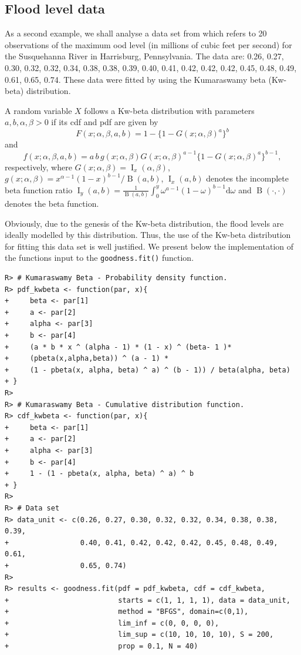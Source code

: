 \documentclass[10pt,letterpaper]{article}
\begin{document}
{\color{red}
\subsection{Flood level data}

As a second example, we shall analyse a data set from \cite{Dumonceaux73} which refers to 20 observations of
the maximum ood level (in millions of cubic feet per second) for the Susquehanna River in Harrisburg, Pennsylvania.
The data are: 0.26, 0.27, 0.30, 0.32, 0.32, 0.34, 0.38, 0.38, 0.39, 0.40, 0.41, 0.42, 0.42, 0.42, 0.45,
0.48, 0.49, 0.61, 0.65, 0.74.
These data were fitted by using the Kumaraswamy beta (Kw-beta) distribution.

A random variable $X$ follows a Kw-beta distribution with parameters $a, b, \alpha, \beta > 0$ if its cdf and pdf are given by
$$
F(x; \alpha, \beta, a, b) = 1-\{1-G(x; \alpha, \beta)^{a}\}^{b}$$
and
$$
f(x; \alpha, \beta, a, b) = a\,b\,g(x;\alpha, \beta)G(x;\alpha, \beta)^{a-1}\{1-G(x;\alpha, \beta)^{a}\}^{b-1},
$$
respectively, where $G(x; \alpha,\beta)=\operatorname{I}_{x}(\alpha,\beta)$, $g(x;\alpha,\beta) = x^{\alpha-1}(1-x)^{b-1}/\operatorname{B}(a,b)$,
$\operatorname{I}_{x}(a,b)$ denotes the incomplete beta function ratio
$\operatorname{I}_{y}(a,b) = \frac{1}{\operatorname{B}(a,b)}
\int^{y}_{0} \omega^{a-1}(1-\omega)^{b-1}\mathrm{d}\omega$
and $\operatorname{B}(\cdot,\cdot)$ denotes the beta function.

Obviously, due to the genesis of the Kw-beta distribution, the flood levels are ideally modelled by
this distribution.
Thus, the use of the Kw-beta distribution for fitting this data set is well justified.
We present below the implementation of the functions input to the \texttt{goodness.fit()} function.

\begin{verbatim}
R> # Kumaraswamy Beta - Probability density function.
R> pdf_kwbeta <- function(par, x){
+     beta <- par[1]
+     a <- par[2]
+     alpha <- par[3]
+     b <- par[4]
+     (a * b * x ^ (alpha - 1) * (1 - x) ^ (beta- 1 )*
+     (pbeta(x,alpha,beta)) ^ (a - 1) *
+     (1 - pbeta(x, alpha, beta) ^ a) ^ (b - 1)) / beta(alpha, beta)
+ }
R>
R> # Kumaraswamy Beta - Cumulative distribution function.
R> cdf_kwbeta <- function(par, x){
+     beta <- par[1]
+     a <- par[2]
+     alpha <- par[3]
+     b <- par[4]
+     1 - (1 - pbeta(x, alpha, beta) ^ a) ^ b
+ }
R>
R> # Data set
R> data_unit <- c(0.26, 0.27, 0.30, 0.32, 0.32, 0.34, 0.38, 0.38, 0.39,
+                 0.40, 0.41, 0.42, 0.42, 0.42, 0.45, 0.48, 0.49, 0.61,
+                 0.65, 0.74)
R>
R> results <- goodness.fit(pdf = pdf_kwbeta, cdf = cdf_kwbeta,
+                          starts = c(1, 1, 1, 1), data = data_unit,
+                          method = "BFGS", domain=c(0,1),
+                          lim_inf = c(0, 0, 0, 0),
+                          lim_sup = c(10, 10, 10, 10), S = 200,
+                          prop = 0.1, N = 40)


\end{verbatim}}
\end{document}
